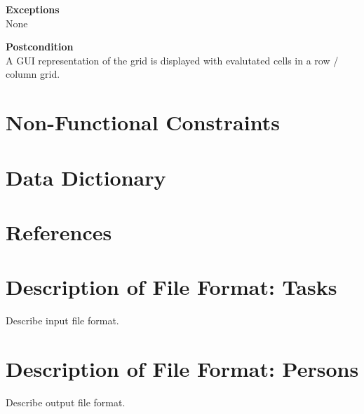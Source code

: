 \documentclass[12pt]{article}
\begin{document}
\noindent
{\bf Exceptions}\\
None

\noindent
{\bf Postcondition}\\
A GUI representation of the grid is displayed with evalutated cells in a row / column grid.

\clearpage

\section{Non-Functional Constraints}

\section{Data Dictionary}

\section{References}

\appendix

\section{Description of File Format: Tasks}

Describe input file format.

\section{Description of File Format: Persons}

Describe output file format.
\end{document}
